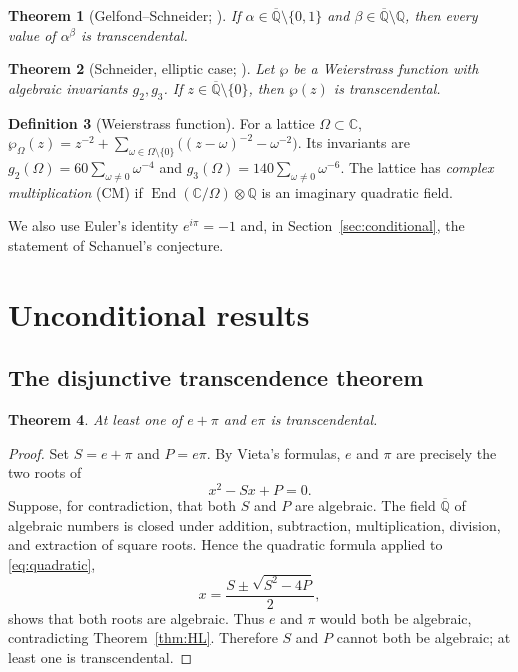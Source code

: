 \documentclass[11pt]{amsart}
\newtheorem{theorem}{Theorem}[section]
\theoremstyle{definition}
\newtheorem{definition}[theorem]{Definition}
\theoremstyle{remark}
\numberwithin{equation}{section}
\newcommand{\Q}{\mathbb{Q}}
\newcommand{\C}{\mathbb{C}}
\newcommand{\Qbar}{\overline{\mathbb{Q}}}
\newcommand{\ee}{e}
\begin{document}
\begin{theorem}[Gelfond--Schneider; {\cite{GS1934}}]\label{thm:GS}
If $\alpha\in\Qbar\setminus\{0,1\}$ and $\beta\in\Qbar\setminus\Q$, then every value of $\alpha^\beta$ is transcendental.
\end{theorem}

\begin{theorem}[Schneider, elliptic case; {\cite{Duke}}]\label{thm:schneider}
Let $\wp$ be a Weierstrass function with algebraic invariants $g_2,g_3$. If $z\in\Qbar\setminus\{0\}$, then $\wp(z)$ is transcendental.
\end{theorem}

\begin{definition}[Weierstrass function]
For a lattice $\Omega\subset\C$, $\wp_\Omega(z)=z^{-2}+\sum_{\omega\in\Omega\setminus\{0\}}\bigl((z-\omega)^{-2}-\omega^{-2}\bigr)$. Its invariants are $g_2(\Omega)=60\sum_{\omega\ne0}\omega^{-4}$ and $g_3(\Omega)=140\sum_{\omega\ne0}\omega^{-6}$. The lattice has \emph{complex multiplication} (CM) if $\operatorname{End}(\C/\Omega)\otimes\Q$ is an imaginary quadratic field.
\end{definition}

We also use Euler's identity $\ee^{i\pi}=-1$ and, in Section~\ref{sec:conditional}, the statement of Schanuel's conjecture.

\section{Unconditional results}\label{sec:unconditional}

\subsection{The disjunctive transcendence theorem}

\begin{theorem}\label{thm:vieta}
At least one of $e+\pi$ and $e\pi$ is transcendental.
\end{theorem}

\begin{proof}
Set $S=e+\pi$ and $P=e\pi$. By Vieta's formulas, $e$ and $\pi$ are precisely the two roots of
\begin{equation}\label{eq:quadratic}
x^2-Sx+P=0.
\end{equation}
Suppose, for contradiction, that both $S$ and $P$ are algebraic. The field $\Qbar$ of algebraic numbers is closed under addition, subtraction, multiplication, division, and extraction of square roots. Hence the quadratic formula applied to \eqref{eq:quadratic},
\[
x=\frac{S\pm\sqrt{S^2-4P}}{2},
\]
shows that both roots are algebraic. Thus $e$ and $\pi$ would both be algebraic, contradicting Theorem~\ref{thm:HL}. Therefore $S$ and $P$ cannot both be algebraic; at least one is transcendental.
\end{proof}
\end{document}
